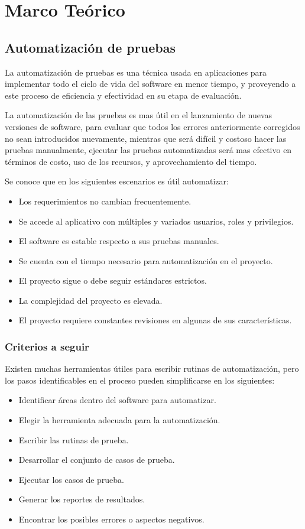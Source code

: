 \chapter{Marco Teórico}

\section{Automatización de pruebas}
La automatización de pruebas es una técnica usada en aplicaciones para
implementar todo el ciclo de vida del software en menor tiempo, y proveyendo a
este proceso de eficiencia y efectividad en su etapa de evaluación.

La automatización de las pruebas es mas útil en el lanzamiento de nuevas
versiones de software, para evaluar que todos los errores anteriormente
corregidos no sean introducidos nuevamente, mientras que será difícil y costoso
hacer las pruebas manualmente, ejecutar las pruebas automatizadas será mas
efectivo en términos de costo, uso de los recursos, y aprovechamiento del
tiempo.

Se conoce que en los siguientes escenarios es útil automatizar:

\begin{itemize}
    \item Los requerimientos no cambian frecuentemente.
    \item Se accede al aplicativo con múltiples y variados usuarios, roles y
        privilegios.
    \item El software es estable respecto a sus pruebas manuales.
    \item Se cuenta con el tiempo necesario para automatización en el proyecto.
    \item El proyecto sigue o debe seguir estándares estrictos.
    \item La complejidad del proyecto es elevada.
    \item El proyecto requiere constantes revisiones en algunas de sus
    características.
\end{itemize}

\subsection{Criterios a seguir}
Existen muchas herramientas útiles para escribir rutinas de automatización, pero
los pasos identificables en el proceso pueden simplificarse en los siguientes:

\begin{itemize}
    \item Identificar áreas dentro del software para automatizar.
    \item Elegir la herramienta adecuada para la automatización.
    \item Escribir las rutinas de prueba.
    \item Desarrollar el conjunto de casos de prueba.
    \item Ejecutar los casos de prueba.
    \item Generar los reportes de resultados.
    \item Encontrar los posibles errores o aspectos negativos.
\end{itemize}

